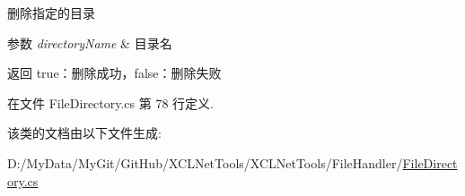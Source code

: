 删除指定的目录 


\begin{DoxyParams}{参数}
{\em directory\-Name} & 目录名\\
\hline
\end{DoxyParams}
\begin{DoxyReturn}{返回}
true：删除成功，false：删除失败
\end{DoxyReturn}


在文件 File\-Directory.\-cs 第 78 行定义.



该类的文档由以下文件生成\-:\begin{DoxyCompactItemize}
\item 
D\-:/\-My\-Data/\-My\-Git/\-Git\-Hub/\-X\-C\-L\-Net\-Tools/\-X\-C\-L\-Net\-Tools/\-File\-Handler/\hyperlink{_file_directory_8cs}{File\-Directory.\-cs}\end{DoxyCompactItemize}
